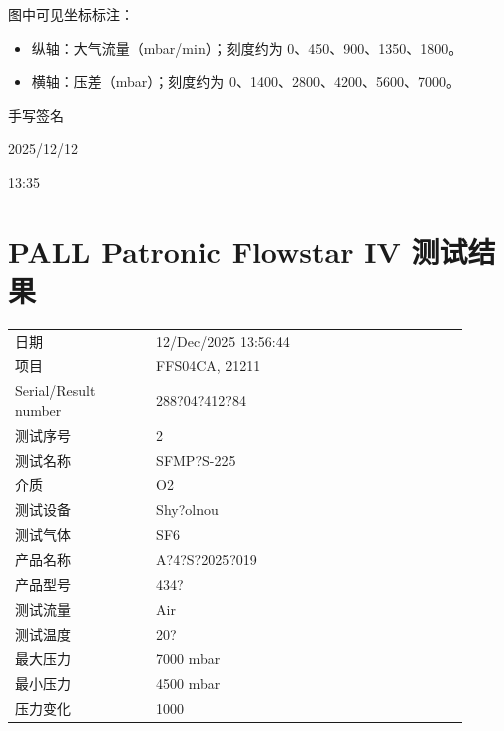 \documentclass[UTF8,10pt,a4paper,fontset=fandol]{ctexart}
\newcommand{\fieldvalue}[1]{#1}
\newcommand{\handwritten}[1]{#1}
\begin{document}
图中可见坐标标注：

\begin{itemize}
    \item 纵轴：大气流量（mbar/min）；刻度约为 0、450、900、1350、1800。
    \item 横轴：压差（mbar）；刻度约为 0、1400、2800、4200、5600、7000。
\end{itemize}

\fieldvalue{\handwritten{手写签名}}

\fieldvalue{\handwritten{2025/12/12}}

\fieldvalue{\handwritten{13:35}}

\newpage

\section*{PALL Patronic Flowstar IV 测试结果}

\begin{tabular}{@{}p{0.28\linewidth}p{0.62\linewidth}@{}}
日期 &
\fieldvalue{12/Dec/2025 13:56:44}
\\
项目 &
\fieldvalue{FFS04CA, 21211}
\\
Serial/Result number &
\fieldvalue{288?04?412?84}
\\
测试序号 &
\fieldvalue{2}
\\
测试名称 &
\fieldvalue{SFMP?S-225}
\\
介质 &
\fieldvalue{O2}
\\
测试设备 &
\fieldvalue{Shy?olnou}
\\
测试气体 &
\fieldvalue{SF6}
\\
产品名称 &
\fieldvalue{A?4?S?2025?019}
\\
产品型号 &
\fieldvalue{434?}
\\
测试流量 &
\fieldvalue{Air}
\\
测试温度 &
\fieldvalue{20?}
\\
最大压力 &
\fieldvalue{7000 mbar}
\\
最小压力 &
\fieldvalue{4500 mbar}
\\
压力变化 &
\fieldvalue{1000}
\end{tabular}
\end{document}
